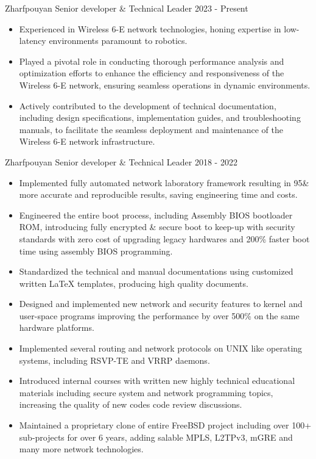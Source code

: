 \documentclass[12pt]{developercv}
\begin{document}
\begin{entrylist}
	\entry
		{Zharfpouyan}
		{Senior developer \& Technical Leader}
		{2023 - Present}
		{
  			\begin{itemize}
				\itemsep0em

        			\item Experienced in Wireless 6-E network technologies, honing expertise in low-latency
	   			environments paramount to robotics.
       				\item Played a pivotal role in conducting thorough performance analysis and optimization
	   			efforts to enhance the efficiency and responsiveness of the Wireless 6-E network, ensuring
       				seamless operations in dynamic environments.
	   			\item Actively contributed to the development of technical documentation, including design
       				specifications, implementation guides, and troubleshooting manuals, to facilitate the seamless
	   			deployment and maintenance of the Wireless 6-E network infrastructure.
			\end{itemize}
		}
	\entry
		{Zharfpouyan}
		{Senior developer \& Technical Leader}
		{2018 - 2022}
		{
			\begin{itemize}
				\itemsep0em
				\item Implemented fully automated network laboratory framework resulting in 95\&
				more accurate and reproducible results, saving engineering time and costs.
				\item Engineered the entire boot process, including Assembly BIOS bootloader ROM, introducing fully encrypted \& secure
				boot to keep-up with security standards with zero cost of upgrading legacy hardwares and
				200\% faster boot time using assembly BIOS programming.
				\item Standardized the technical and manual documentations using customized written \LaTeX
				templates, producing high quality documents.
				\item Designed and implemented new network and security features to kernel and user-space
				programs improving the performance by over 500\% on the same hardware platforms.
				\item Implemented several routing and network protocols on UNIX like operating systems,
				including RSVP-TE and VRRP daemons.
				\item Introduced internal courses with written new highly technical educational materials including
				secure system and network programming topics, increasing the quality of
				new codes code review discussions.
				\item Maintained a proprietary clone of entire FreeBSD project including over 100+ sub-projects
				for over 6 years, adding
				salable MPLS, L2TPv3, mGRE and many more network technologies.
			\end{itemize}

}
\end{entrylist}
\end{document}

